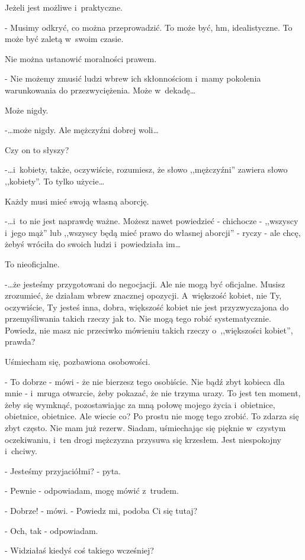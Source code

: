 \documentclass[oneside,polish,12pt,sfheadings]{mwbk}
\begin{document}
Jeżeli jest możliwe i~praktyczne.

- Musimy odkryć, co można przeprowadzić. To może być, hm, idealistyczne.
To może być zaletą w~swoim czasie.

Nie można ustanowić moralności prawem.

- Nie możemy zmusić ludzi wbrew ich skłonnościom i~mamy pokolenia
warunkowania do przezwyciężenia. Może w~dekadę\ldots

Może nigdy.

-\ldots może nigdy. Ale mężczyźni dobrej woli\ldots

Czy on to słyszy?

-\ldots i~kobiety, także, oczywiście, rozumiesz, że słowo ,,mężczyźni''
zawiera słowo ,,kobiety''. To tylko użycie\ldots

Każdy musi mieć swoją własną aborcję.

-\ldots i~to nie jest naprawdę ważne. Możesz nawet powiedzieć - chichocze
- ,,wszyscy i~jego mąż'' lub ,,wszyscy będą mieć prawo do własnej
aborcji'' - ryczy - ale chcę, żebyś wróciła do swoich ludzi i~powiedziała
im\ldots

To nieoficjalne.

-\ldots że jesteśmy przygotowani do negocjacji. Ale nie mogą być oficjalne.
Musisz zrozumieć, że działam wbrew znacznej opozycji. A~większość
kobiet, nie Ty, oczywiście, Ty jesteś inna, dobra, większość kobiet
nie jest przyzwyczajona do przemyśliwania takich rzeczy jak to. Nie
mogą tego robić systematycznie. Powiedz, nie masz nic przeciwko mówieniu
takich rzeczy o~,,większości kobiet'', prawda?

Uśmiecham się, pozbawiona osobowości.

- To dobrze - mówi - że nie bierzesz tego osobiście. Nie bądź zbyt
kobieca dla mnie - i~mruga otwarcie, żeby pokazać, że nie trzyma urazy.
To jest ten moment, żeby się wymknąć, pozostawiając za mną połowę
mojego życia i~obietnice, obietnice, obietnice. Ale wiecie co? Po
prostu nie mogę tego zrobić. To zdarza się zbyt często. Nie mam już
rezerw. Siadam, uśmiechając się pięknie w~czystym oczekiwaniu, i~ten
drogi mężczyzna przysuwa się krzesłem. Jest niespokojny i~chciwy.

- Jesteśmy przyjaciółmi? - pyta.

- Pewnie - odpowiadam, mogę mówić z~trudem.

- Dobrze! - mówi. - Powiedz mi, podoba Ci się tutaj?

- Och, tak - odpowiadam.

- Widziałaś kiedyś coś takiego wcześniej?
\end{document}
